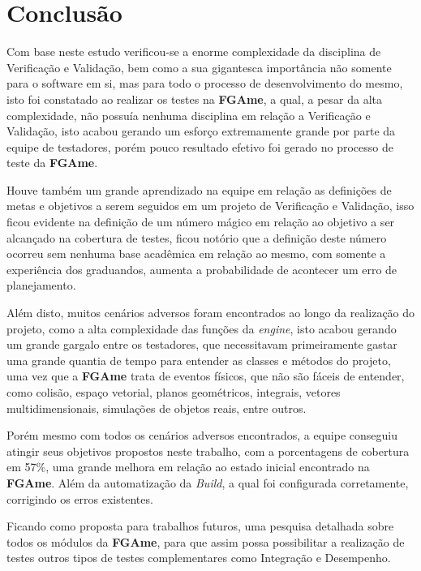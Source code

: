 \chapter{Conclusão}

Com base neste estudo verificou-se a enorme complexidade da disciplina de Verificação e Validação, bem como a sua gigantesca importância não somente para o software em si, mas para todo o processo de desenvolvimento do mesmo, isto foi constatado ao realizar os testes na \textbf{FGAme}, a qual, a pesar da alta complexidade, não possuía nenhuma disciplina em relação a Verificação e Validação, isto acabou gerando um esforço extremamente grande por parte da equipe de testadores, porém pouco resultado efetivo foi gerado no processo de teste da \textbf{FGAme}.

Houve também um grande aprendizado na equipe em relação as definições de metas e objetivos a serem seguidos em um projeto de Verificação e Validação, isso ficou evidente na definição de um número mágico em relação ao objetivo a ser alcançado na cobertura de testes, ficou notório que a definição deste número ocorreu sem nenhuma base acadêmica em relação ao mesmo, com somente a experiência dos graduandos, aumenta a probabilidade de acontecer um erro de planejamento.

Além disto, muitos cenários adversos foram encontrados ao longo da realização do projeto, como a alta complexidade das funções da \textit{engine}, isto acabou gerando um grande gargalo entre os testadores, que necessitavam primeiramente gastar uma grande quantia de tempo para entender as classes e métodos do projeto, uma vez que a \textbf{FGAme} trata de eventos físicos, que não são fáceis de entender, como colisão, espaço vetorial, planos geométricos, integrais, vetores multidimensionais, simulações de objetos reais, entre outros.

Porém mesmo com todos os cenários adversos encontrados, a equipe conseguiu atingir seus objetivos propostos neste trabalho, com a porcentagens de cobertura em 57\%, uma grande melhora em relação ao estado inicial encontrado na \textbf{FGAme}. Além da automatização da \textit{Build}, a qual foi configurada corretamente, corrigindo os erros existentes. 

Ficando como proposta para trabalhos futuros, uma pesquisa detalhada sobre todos os módulos da \textbf{FGAme}, para que assim possa possibilitar a realização de testes outros tipos de testes complementares como Integração e Desempenho.
